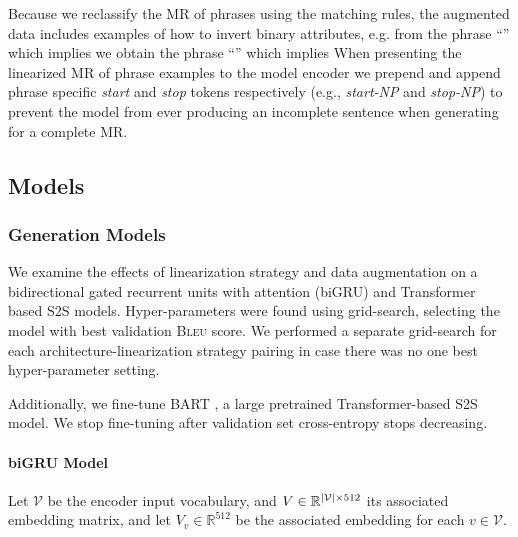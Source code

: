 Because 
we reclassify the MR of phrases using the matching rules, 
the augmented  data includes examples of
how to invert binary attributes, e.g. from the phrase
``'' which implies 
we obtain the phrase ``'' which implies 
When presenting the linearized MR of phrase examples to the model encoder
we prepend and append phrase specific \textit{start} and \textit{stop} tokens respectively
(e.g., \textit{start-NP} and \textit{stop-NP}) to prevent the model
from ever producing an incomplete sentence when generating for a complete MR.







\subsection{Models}
\subsubsection{Generation Models}
We examine the effects of linearization strategy and data augmentation
on a bidirectional gated recurrent units with attention (biGRU)
and Transformer based S2S models.
Hyper-parameters were found using grid-search, selecting the model
with best validation \textsc{Bleu} \cite{papineni2002bleu} score. We performed a separate
grid-search for each architecture-linearization strategy pairing in case
there was no one best hyper-parameter setting.

Additionally, we
fine-tune BART \cite{lewis2019bart}, a large pretrained Transformer-based S2S model. We stop fine-tuning after validation set cross-entropy stops decreasing.

\paragraph{biGRU Model}
Let $\mathcal{V}$ be the encoder input vocabulary, and  $V \in\mathbb{R}^{|\mathcal{V}|\times 512}$ its associated embedding matrix, and let
$V_v \in \mathbb{R}^{512}$ be the associated embedding for
each $v \in \mathcal{V}$.

